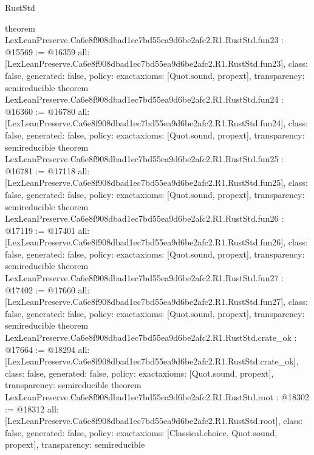\begin{lexlean}{RustStd}
\begin{coremodule}
{}
theorem LexLeanPreserve.Ca6e8f908dbad1ec7bd55ea9d6be2afc2.R1.RustStd.fun23 : @15569 := @16359 {
  all: [LexLeanPreserve.Ca6e8f908dbad1ec7bd55ea9d6be2afc2.R1.RustStd.fun23],
  class: false,
  generated: false,
  policy: exact{axioms: [Quot.sound, propext]},
  transparency: semireducible
}
theorem LexLeanPreserve.Ca6e8f908dbad1ec7bd55ea9d6be2afc2.R1.RustStd.fun24 : @16360 := @16780 {
  all: [LexLeanPreserve.Ca6e8f908dbad1ec7bd55ea9d6be2afc2.R1.RustStd.fun24],
  class: false,
  generated: false,
  policy: exact{axioms: [Quot.sound, propext]},
  transparency: semireducible
}
theorem LexLeanPreserve.Ca6e8f908dbad1ec7bd55ea9d6be2afc2.R1.RustStd.fun25 : @16781 := @17118 {
  all: [LexLeanPreserve.Ca6e8f908dbad1ec7bd55ea9d6be2afc2.R1.RustStd.fun25],
  class: false,
  generated: false,
  policy: exact{axioms: [Quot.sound, propext]},
  transparency: semireducible
}
theorem LexLeanPreserve.Ca6e8f908dbad1ec7bd55ea9d6be2afc2.R1.RustStd.fun26 : @17119 := @17401 {
  all: [LexLeanPreserve.Ca6e8f908dbad1ec7bd55ea9d6be2afc2.R1.RustStd.fun26],
  class: false,
  generated: false,
  policy: exact{axioms: [Quot.sound, propext]},
  transparency: semireducible
}
theorem LexLeanPreserve.Ca6e8f908dbad1ec7bd55ea9d6be2afc2.R1.RustStd.fun27 : @17402 := @17660 {
  all: [LexLeanPreserve.Ca6e8f908dbad1ec7bd55ea9d6be2afc2.R1.RustStd.fun27],
  class: false,
  generated: false,
  policy: exact{axioms: [Quot.sound, propext]},
  transparency: semireducible
}
theorem LexLeanPreserve.Ca6e8f908dbad1ec7bd55ea9d6be2afc2.R1.RustStd.crate_ok : @17664 := @18294 {
  all: [LexLeanPreserve.Ca6e8f908dbad1ec7bd55ea9d6be2afc2.R1.RustStd.crate_ok],
  class: false,
  generated: false,
  policy: exact{axioms: [Quot.sound, propext]},
  transparency: semireducible
}
theorem LexLeanPreserve.Ca6e8f908dbad1ec7bd55ea9d6be2afc2.R1.RustStd.root : @18302 := @18312 {
  all: [LexLeanPreserve.Ca6e8f908dbad1ec7bd55ea9d6be2afc2.R1.RustStd.root],
  class: false,
  generated: false,
  policy: exact{axioms: [Classical.choice, Quot.sound, propext]},
  transparency: semireducible
}


\end{coremodule}
\end{lexlean}
